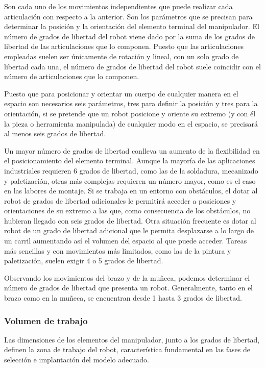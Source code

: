\documentclass[12pt,a4papert,woside,openright,titlepage,final]{book}
\begin{document}
Son cada uno de los movimientos independientes que
puede realizar cada articulación con respecto a la anterior. Son los
parámetros que se precisan para determinar la posición y la orientación del
elemento terminal del manipulador. El número de grados de libertad del robot
viene dado por la suma de los grados de libertad de las articulaciones que lo componen.
Puesto que las articulaciones empleadas suelen ser únicamente de rotación y
lineal, con un solo grado de libertad cada una, el número de grados de libertad del
robot suele coincidir con el número de articulaciones que lo componen. 

Puesto que para posicionar y orientar un cuerpo de cualquier manera en el
espacio son necesarios seis parámetros, tres para definir la posición y tres
para la orientación, si se pretende que un robot posicione y oriente su
extremo (y con él la pieza o herramienta manipulada) de cualquier modo en el
espacio, se precisará al menos seis grados de libertad.

Un mayor número de grados de libertad conlleva un aumento de la flexibilidad
en el posicionamiento del elemento terminal. Aunque la mayoría de las
aplicaciones industriales requieren 6 grados de libertad, como las de la soldadura,
mecanizado y paletización, otras más complejas requieren un número mayor,
como es el caso en las labores de montaje. Si se trabaja en un entorno con
obstáculos, el dotar al robot de grados de libertad adicionales le permitirá
acceder a posiciones y orientaciones de su extremo a las que, como
consecuencia de los obstáculos, no hubieran llegado con seis grados de
libertad. Otra situación frecuente es dotar al robot de un grado de libertad
adicional que le permita desplazarse a lo largo de un carril aumentando así
el volumen del espacio al que puede acceder. Tareas más sencillas y con
movimientos más limitados, como las de la pintura y paletización, suelen
exigir 4 o 5 grados de libertad.

Observando los movimientos del brazo y de la muñeca, podemos determinar el
número de grados de libertad que presenta un robot. Generalmente, tanto en
el brazo como en la muñeca, se encuentran desde 1 hasta 3 grados de libertad. 


\subsubsection{Volumen de trabajo}

Las dimensiones de los elementos del manipulador, junto a los grados de
libertad, definen la zona de trabajo del robot, característica fundamental en
las fases de selección e implantación del modelo adecuado.
\end{document}
